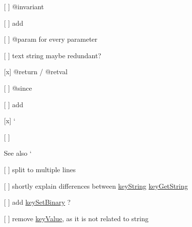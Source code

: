 \begin{DoxyItemize}
\begin{DoxyItemize}
\end{DoxyItemize}
\item \mbox{[} \mbox{]} {\ttfamily @invariant}
\begin{DoxyItemize}
\item \mbox{[} \mbox{]} add
\end{DoxyItemize}
\item \mbox{[} \mbox{]} {\ttfamily @param} for every parameter
\begin{DoxyItemize}
\item \mbox{[} \mbox{]} \textquotesingle{}text string\textquotesingle{} maybe redundant?
\end{DoxyItemize}
\item \mbox{[}x\mbox{]} {\ttfamily @return} / {\ttfamily @retval}
\item \mbox{[} \mbox{]} {\ttfamily @since}
\begin{DoxyItemize}
\item \mbox{[} \mbox{]} add
\end{DoxyItemize}
\item \mbox{[}x\mbox{]} `{\ttfamily }
\item {\ttfamily \mbox{[} \mbox{]}}\begin{DoxySeeAlso}{See also}
`
\begin{DoxyItemize}
\item \mbox{[} \mbox{]} split to multiple lines
\item \mbox{[} \mbox{]} shortly explain differences between {\ttfamily \hyperlink{group__keyvalue_ga880936f2481d28e6e2acbe7486a21d05}{key\+String}} {\ttfamily \hyperlink{group__keyvalue_ga41b9fac5ccddafe407fc0ae1e2eb8778}{key\+Get\+String}}
\item \mbox{[} \mbox{]} add {\ttfamily \hyperlink{group__keyvalue_gaa50a5358fd328d373a45f395fa1b99e7}{key\+Set\+Binary}} ?
\item \mbox{[} \mbox{]} remove {\ttfamily \hyperlink{group__keyvalue_ga6f29609c5da53c6dc26a98678d5752af}{key\+Value}}, as it is not related to string
\end{DoxyItemize}
\end{DoxySeeAlso}

\end{DoxyItemize}



